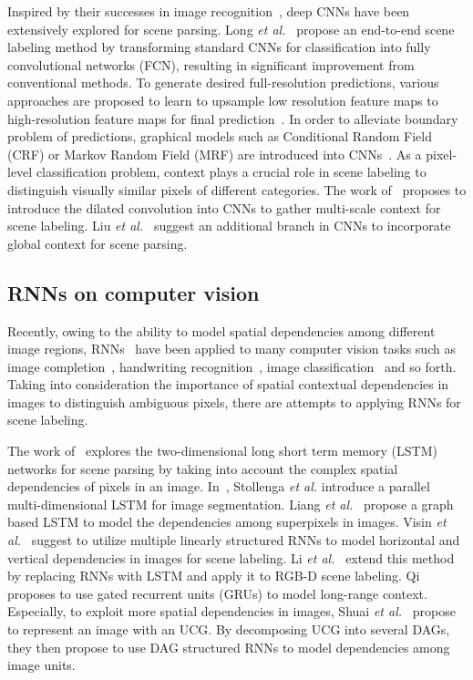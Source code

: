 \documentclass[10pt,twocolumn,letterpaper]{article}
\begin{document}
Inspired by their successes in image recognition~\cite{krizhevsky2012imagenet,simonyan2014very,he2016deep}, deep CNNs have been extensively explored for scene parsing. Long {\it et al.}~\cite{long2015fully} propose an end-to-end scene labeling method by transforming standard CNNs for classification into fully convolutional networks (FCN), resulting in significant improvement from conventional methods. To generate desired full-resolution predictions, various approaches are proposed to learn to upsample low resolution feature maps to high-resolution feature maps for final prediction~\cite{noh2015learning,badrinarayanan2015segnet,lin2016refinenet}. In order to alleviate boundary problem of predictions, graphical models such as Conditional Random Field (CRF) or Markov Random Field (MRF) are introduced into CNNs~\cite{chen2016deeplab,zheng2015conditional,liu2015semantic}. As a pixel-level classification problem, context plays a crucial role in scene labeling to distinguish visually similar pixels of different categories. The work of~\cite{yu2015multi} proposes to introduce the dilated convolution into CNNs to gather multi-scale context for scene labeling. Liu {\it et al.}~\cite{liu2015parsenet} suggest an additional branch in CNNs to incorporate global context for scene parsing.

\subsection{RNNs on computer vision}

Recently, owing to the ability to model spatial dependencies among different image regions, RNNs~\cite{elman1990finding} have been applied to many computer vision tasks such as image completion~\cite{oord2016pixel}, handwriting recognition~\cite{graves2009offline}, image classification~\cite{zuo2016learning} and so forth. Taking into consideration the importance of spatial contextual dependencies in images to distinguish ambiguous pixels, there are attempts to applying RNNs for scene labeling.

The work of~\cite{byeon2015scene} explores the two-dimensional long short term memory (LSTM) networks for scene parsing by taking into account the complex spatial dependencies of pixels in an image. In~\cite{stollenga2015parallel}, Stollenga {\it et al.} introduce a parallel multi-dimensional LSTM for image segmentation. Liang {\it et al.}~\cite{liang2016semantic} propose a graph based LSTM to model the dependencies among superpixels in images. Visin {\it et al.}~\cite{visin2016reseg} suggest to utilize multiple linearly structured RNNs to model horizontal and vertical dependencies in images for scene labeling. Li {\it et al.}~\cite{li2016lstm} extend this method by replacing RNNs with LSTM and apply it to RGB-D scene labeling. Qi~\cite{qi2016hierarchically} proposes to use gated recurrent units (GRUs) to model long-range context. Especially, to exploit more spatial dependencies in images, Shuai {\it et al.}~\cite{shuai2017scene} propose to represent an image with an UCG. By decomposing UCG into several DAGs, they then propose to use DAG structured RNNs to model dependencies among image units.
\end{document}
